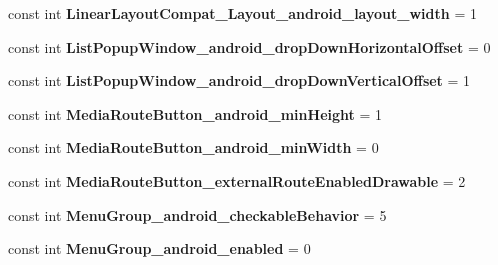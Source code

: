 \begin{DoxyCompactItemize}
const int {\bfseries Linear\+Layout\+Compat\+\_\+\+Layout\+\_\+android\+\_\+layout\+\_\+width} = 1
\item 
\mbox{\label{class_sample_app_1_1_droid_1_1_resource_1_1_styleable_a2ef49de70eac01464bf326922037c9d0}} 
const int {\bfseries List\+Popup\+Window\+\_\+android\+\_\+drop\+Down\+Horizontal\+Offset} = 0
\item 
\mbox{\label{class_sample_app_1_1_droid_1_1_resource_1_1_styleable_ac664ab44cf295dd7921acb8e03c663f8}} 
const int {\bfseries List\+Popup\+Window\+\_\+android\+\_\+drop\+Down\+Vertical\+Offset} = 1
\item 
\mbox{\label{class_sample_app_1_1_droid_1_1_resource_1_1_styleable_a939591389d445474573a089185124e32}} 
const int {\bfseries Media\+Route\+Button\+\_\+android\+\_\+min\+Height} = 1
\item 
\mbox{\label{class_sample_app_1_1_droid_1_1_resource_1_1_styleable_adca8f790140e2364919dd9c82960e04c}} 
const int {\bfseries Media\+Route\+Button\+\_\+android\+\_\+min\+Width} = 0
\item 
\mbox{\label{class_sample_app_1_1_droid_1_1_resource_1_1_styleable_af278ff7eedc2a608b93c13124f523aac}} 
const int {\bfseries Media\+Route\+Button\+\_\+external\+Route\+Enabled\+Drawable} = 2
\item 
\mbox{\label{class_sample_app_1_1_droid_1_1_resource_1_1_styleable_ad9f18fe1b4ce9dc5b54dfdaaff191194}} 
const int {\bfseries Menu\+Group\+\_\+android\+\_\+checkable\+Behavior} = 5
\item 
\mbox{\label{class_sample_app_1_1_droid_1_1_resource_1_1_styleable_ad2a044e77f17370d64291e195c37d39e}} 
const int {\bfseries Menu\+Group\+\_\+android\+\_\+enabled} = 0
\item 
\mbox{\label{class_sample_app_1_1_droid_1_1_resource_1_1_styleable_af3a15e608b092d3e3f722ccb5a58e168}} 

\end{DoxyCompactItemize}
